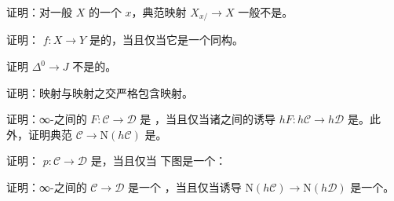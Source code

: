 \begin{exercise}\label{ex:slice-under-not-left-fibration}
证明：对一般\trSimplicialSet{} $X$ 的一个\trObject{} $x$，典范映射
$X_{x/} \to X$ 一般不是\trLeftFibration{}。
\end{exercise}

\begin{exercise}\label{ex:inner-anodyne-iso}
证明：\trInnerFibration{} $f\colon X \to Y$ 是\trInnerAnodyne{}的，当且仅当它是一个同构。
\end{exercise}

\begin{exercise}\label{ex:point-not-inner-anodyne}
证明 $\Delta^0 \to J$ 不是\trInnerAnodyne{}的。
\end{exercise}

\begin{exercise}\label{ex:left-right-anodyne-intersection}
证明：\trLeftAnodyne{}映射与\trRightAnodyne{}映射之交严格包含\trInnerAnodyne{}映射。
\end{exercise}

\begin{exercise}\label{ex:conservative-homotopy-categories}
证明：∞-\trCategories{}之间的\trFunctor{} $F\colon \mathcal{C} \to \mathcal{D}$ 是%
\trConservative{}，当且仅当诸\trHomotopyCategory{}之间的诱导\trFunctor{}%
$hF\colon h\mathcal{C} \to h\mathcal{D}$ 是\trConservative{}。此外，证明典范%
\trFunctor{} $\mathcal{C} \to \mathrm{N}(h\mathcal{C})$ 是\trConservative{}。
\end{exercise}

\begin{exercise}\label{ex:conservative-pullback}
证明：\trFunctor{} $p\colon \mathcal{C} \to \mathcal{D}$ 是\trConservative{}，当且仅当
下图是一个\trPullback{}：
\begin{center}
\end{center}
\end{exercise}

\begin{exercise}\label{ex:inner-fibration-isofibration}
证明：∞-\trCategories{}之间的\trInnerFibration{} $\mathcal{C} \to \mathcal{D}$ 是一个%
\trIsofibration{}，当且仅当诱导\trFunctor{}%
$\mathrm{N}(h\mathcal{C}) \to \mathrm{N}(h\mathcal{D})$ 是一个\trIsofibration{}。
\end{exercise}

